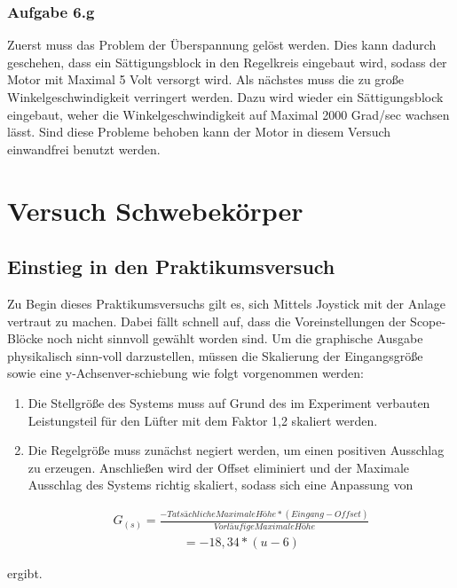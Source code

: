 \documentclass[10pt]{scrartcl}
\begin{document}
\subsubsection{Aufgabe 6.g}	
Zuerst muss das Problem der Überspannung gelöst werden. Dies kann dadurch geschehen, dass ein Sättigungsblock in den Regelkreis eingebaut wird, sodass der Motor mit Maximal 5 Volt versorgt wird. Als nächstes muss die zu große Winkelgeschwindigkeit verringert werden. Dazu wird wieder ein Sättigungsblock eingebaut, weher die Winkelgeschwindigkeit auf Maximal 2000 Grad/sec wachsen lässt. Sind diese Probleme behoben kann der Motor in diesem Versuch einwandfrei benutzt werden.
\newpage
\section{Versuch Schwebekörper}
\subsection{Einstieg in den Praktikumsversuch}
Zu Begin dieses Praktikumsversuchs gilt es, sich Mittels Joystick mit der Anlage vertraut zu machen. Dabei fällt schnell auf, dass die Voreinstellungen der Scope-Blöcke noch nicht sinnvoll gewählt worden sind. Um die graphische Ausgabe physikalisch sinn-voll darzustellen, müssen die Skalierung der Eingangsgröße sowie eine y-Achsenver-schiebung wie folgt vorgenommen werden:

\begin{enumerate}
\item Die Stellgröße des Systems muss auf Grund des im Experiment verbauten Leistungsteil für den Lüfter mit dem Faktor 1,2 skaliert werden.
\item Die Regelgröße muss zunächst negiert werden, um einen positiven Ausschlag zu erzeugen. Anschließen wird der Offset eliminiert und der Maximale Ausschlag des Systems richtig skaliert, sodass sich eine Anpassung von


\begin{align}
   G_{(s)}=\frac{-Tatsächliche Maximale Höhe*(Eingang-Offset)}{Vorläufige Maximale Höhe}
\end{align}
\begin{align}
= -18,34*(u-6)
\end{align}
\end{enumerate}
ergibt.
\end{document}
